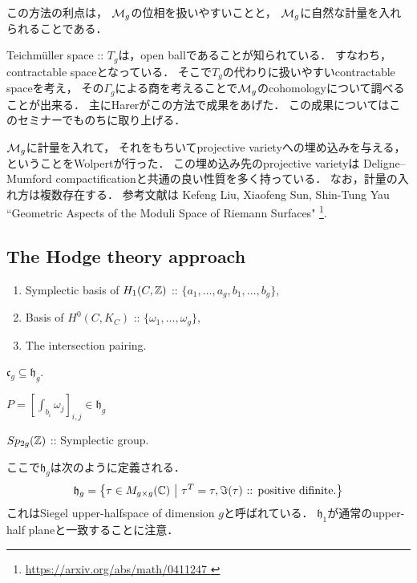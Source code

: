 \documentclass[a4paper]{jsarticle}
\begin{document}
    この方法の利点は，
    $\mathcal{M}_g$の位相を扱いやすいことと，
    $\mathcal{M}_g$に自然な計量を入れられることである．

    Teichm\"uller space :: $T_g$は，open ballであることが知られている．
    すなわち，contractable spaceとなっている．
    そこで$T_g$の代わりに扱いやすいcontractable spaceを考え，
    その$\Gamma_g$による商を考えることで$\mathcal{M}_g$のcohomologyについて調べることが出来る．
    主にHarerがこの方法で成果をあげた．
    この成果についてはこのセミナーでものちに取り上げる．

    $\mathcal{M}_g$に計量を入れて，
    それをもちいてprojective varietyへの埋め込みを与える，
    ということをWolpertが行った．
    この埋め込み先のprojective varietyは
    Deligne--Mumford compactificationと共通の良い性質を多く持っている．
    なお，計量の入れ方は複数存在する．
    参考文献は
    Kefeng Liu, Xiaofeng Sun, Shin-Tung Yau
    ``Geometric Aspects of the Moduli Space of Riemann Surfaces"
    \footnote{\url{ https://arxiv.org/abs/math/0411247 }}.

    \subsection{The Hodge theory approach}
    \begin{description}[leftmargin=!,labelwidth=\widthof{\bfseries Parameter Space}]
        \item[Extra Data]
            \begin{enumerate}[leftmargin=*]
                \item Symplectic basis of $H_1(C, \mathbb{Z})$ :: $\{a_1,\dots,a_g, b_1,\dots,b_g\}$,
                \item Basis of $H^0(C, K_C)$ :: $\{\omega_1,\dots,\omega_g\}$,
                \item The intersection pairing.
            \end{enumerate}
        \item[Parameter Space] $\mathfrak{c}_g \subseteq \mathfrak{h}_g$.
        \item[Correspondance] $P=[\int_{b_i} \omega_j ]_{i,j} \in \mathfrak{h}_g$
        \item[Group] $Sp_{2g}(\mathbb{Z})$ :: Symplectic group.
    \end{description}
    ここで$\mathfrak{h}_g$は次のように定義される．
    \[
        \mathfrak{h}_g=
        \left\{
            \tau \in M_{g \times g}(\mathbb{C})
            ~\middle|~
            \tau^T=\tau, \Im(\tau)\text{ :: positive difinite.}
        \right\}
    \]
    これはSiegel upper-halfspace of dimension $g$と呼ばれている．
    $\mathfrak{h}_1$が通常のupper-half planeと一致することに注意．
\end{document}
